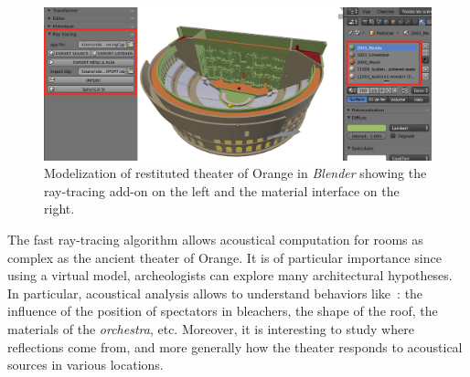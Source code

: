 \documentclass{aes2e}
\begin{document}
\begin{figure}[t]
\centering
		\includegraphics[width=\linewidth]{soft}
		\caption{Modelization of restituted theater of Orange \cite{theseRobin} in \textit{Blender} showing the ray-tracing add-on on the left and the material interface on the right.}
		\label{soft}
\end{figure}

The fast ray-tracing algorithm allows acoustical computation for rooms as complex as the ancient theater of Orange. It is of particular importance since using a virtual model, archeologists can explore many architectural hypotheses. In particular, acoustical analysis allows to understand behaviors like~: the influence of the position of spectators in bleachers, the shape of the roof, the materials of the \textit{orchestra}, etc. Moreover, it is interesting to study where reflections come from, and more generally how the theater responds to acoustical sources in various locations.     
\end{document}
